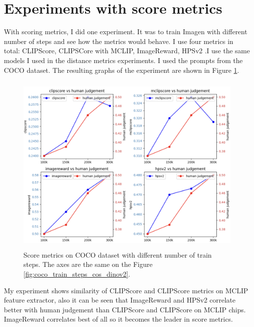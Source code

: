 \section{Experiments with score metrics}
With scoring metrics, I did one experiment. It was to train Imagen with different number of steps and see how the metrics would behave. I use four metrics in total: CLIPScore\cite{CLIPScore}, CLIPSCore with MCLIP, ImageReward\cite{Image_reward}, HPSv2\cite{HPSv2} .I use the same models I used in the distance metrics experiments. I used the prompts from the COCO dataset. The resulting graphs of the experiment are shown in Figure \ref{fig:coco_train_steps_score_metrics}.

\begin{figure}[]
\centering
\includegraphics[width=15cm, height=9cm]{figs/coco_train_steps_score_metrics.png}
\caption{Score metrics on COCO dataset with different number of train steps. The axes are the same on the Figure \ref{fig:coco_train_steps_cos_dinov2}.}
\label{fig:coco_train_steps_score_metrics}
\end{figure}

My experiment shows similarity of CLIPScore and CLIPScore metrics on MCLIP feature extractor, also it can be seen that ImageReward and HPSv2 correlate better with human judgement than CLIPScore and CLIPScore on MCLIP chips. ImageReward correlates best of all so it becomes the leader in score metrics.
